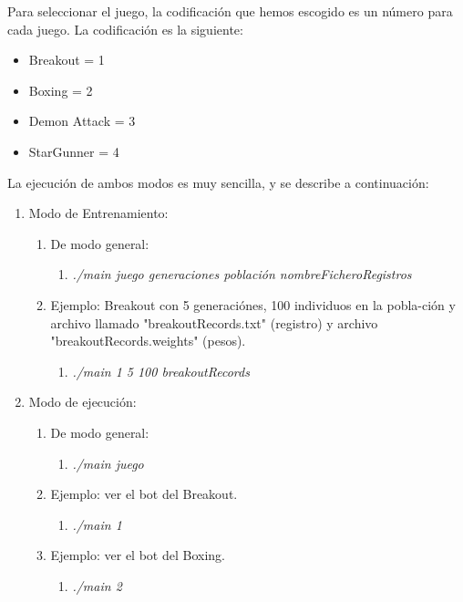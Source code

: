 Para seleccionar el juego, la codificación que hemos escogido es un número para cada juego. La codificación es la siguiente:

\begin{itemize}
    \item Breakout = 1
    \item Boxing = 2
    \item Demon Attack = 3
    \item StarGunner = 4
\end{itemize}

La ejecución de ambos modos es muy sencilla, y se describe a continuación:

\begin{enumerate}
    \item Modo de Entrenamiento: 
    \begin{enumerate}
        \item De modo general:
        \begin{enumerate}
            \item \textit{./main juego generaciones población nombreFicheroRegistros}
        \end{enumerate}
        \item Ejemplo: Breakout con 5 generaciónes, 100 individuos en la pobla-ción y archivo llamado "breakoutRecords.txt" (registro) y archivo "breakoutRecords.weights" (pesos).
        \begin{enumerate}
            \item \textit{./main 1 5 100 breakoutRecords}
        \end{enumerate}
    \end{enumerate}
    \item Modo de ejecución:
    \begin{enumerate}
        \item De modo general:
        \begin{enumerate}
            \item \textit{./main juego}
        \end{enumerate}
        \item Ejemplo: ver el bot del Breakout.
        \begin{enumerate}
            \item \textit{./main 1}
        \end{enumerate}
        \item Ejemplo: ver el bot del Boxing.
        \begin{enumerate}
            \item \textit{./main 2}

\end{enumerate}
\end{enumerate}
\end{enumerate}
